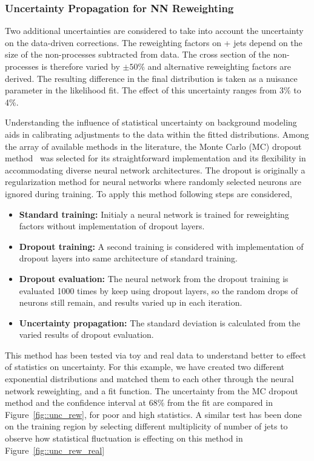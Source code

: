 \subsubsection{Uncertainty Propagation for NN Reweighting}
\label{sec:NN_reweighting:uncertainty}

Two additional uncertainties are considered to take into account the uncertainty on the data-driven
corrections. The reweighting factors on \ttbar + jets depend on the size of the non-\ttbar processes subtracted from data.
The cross section of the non-\ttbar processes is therefore varied by $\pm 50\%$ and alternative reweighting
factors are derived. The resulting difference in the final distribution is taken as a nuisance parameter in the
likelihood fit. The effect of this uncertainty ranges from 3\% to 4\%.

Understanding the influence of statistical uncertainty on background modeling aids in calibrating adjustments to the data within the fitted distributions.
Among the array of available methods in the literature, the Monte Carlo (MC) dropout method~\cite{gal2016dropout} was selected for its straightforward implementation and its flexibility in 
accommodating diverse neural network architectures. The dropout is originally a regularization method for neural networks where randomly selected neurons are ignored during training.
To apply this method following steps are considered,

\begin{itemize}
    \item {\bf Standard training:} Initialy a neural network is trained for reweighting factors without implementation of dropout layers.
    \item {\bf Dropout training:} A second training is considered with implementation of dropout layers into same architecture of standard training.
    \item {\bf Dropout evaluation:} The neural network from the dropout training is evaluated 1000 times by keep using dropout layers, so the random drops of neurons still remain, and results varied up in each iteration.
    \item {\bf Uncertainty propagation:} The standard deviation is calculated from the varied results of dropout evaluation. 
\end{itemize}


This method has been tested via toy and real data to understand better to effect of statistics on uncertainty.
For this example, we have created two different exponential distributions and matched them to each other through the neural network reweighting, and a fit function.
The uncertainty from the MC dropout method and the confidence interval at 68\% from the fit are compared in Figure~\ref{fig::unc_rew}, for poor and high statistics.
A similar test has been done on the training region by selecting different multiplicity of number of jets to observe how statistical fluctuation is effecting on this method in Figure~\ref{fig::unc_rew_real}

